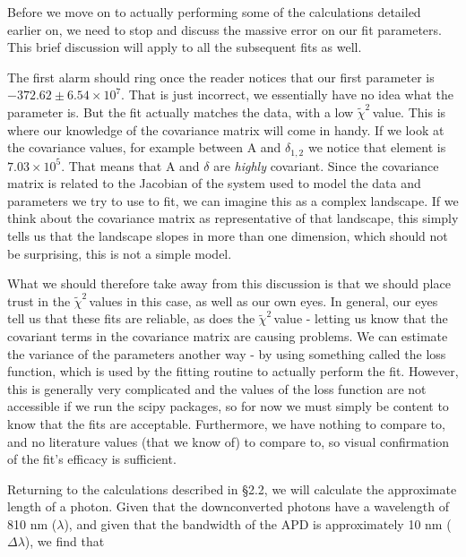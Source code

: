 \documentclass{article}
\newcommand{\redchi}{$\tilde{\chi}^2\,$}
\begin{document}
Before we move on to actually performing some of the calculations detailed earlier on, we need to stop and discuss the massive error on our fit parameters.  This brief discussion will apply to all the subsequent fits as well.

\hspace{.25cm}

The first alarm should ring once the reader notices that our first parameter is $-372.62 \pm 6.54 \times 10^7$.  That is just incorrect, we essentially have no idea what the parameter is.  But the fit actually matches the data, with a low \redchi value.  This is where our knowledge of the covariance matrix will come in handy.  If we look at the covariance values, for example between A and $\delta_{1,2}$ we notice that element is $7.03 \times 10^5$.  That means that A and $\delta$ are \emph{highly} covariant.  Since the covariance matrix is related to the Jacobian of the system used to model the data and parameters we try to use to fit, we can imagine this as a complex landscape.  If we think about the covariance matrix as representative of that landscape, this simply tells us that the landscape slopes in more than one dimension, which should not be surprising, this is not a simple model.

\hspace{.25cm}

What we should therefore take away from this discussion is that we should place trust in the \redchi values in this case, as well as our own eyes.  In general, our eyes tell us that these fits are reliable, as does the \redchi value - letting us know that the covariant terms in the covariance matrix are causing problems.  We can estimate the variance of the parameters another way - by using something called the loss function, which is used by the fitting routine to actually perform the fit.  However, this is generally very complicated and the values of the loss function are not accessible if we run the scipy packages, so for now we must simply be content to know that the fits are acceptable.  Furthermore, we have nothing to compare to, and no literature values (that we know of) to compare to, so visual confirmation of the fit's efficacy is sufficient.

\hspace{.5cm}

Returning to the calculations described in \S 2.2, we will calculate the approximate length of a photon.  Given that the downconverted photons have a wavelength of 810 nm ($\lambda$), and given that the bandwidth of the APD is approximately 10 nm ($\Delta \lambda$), we find that
\end{document}
